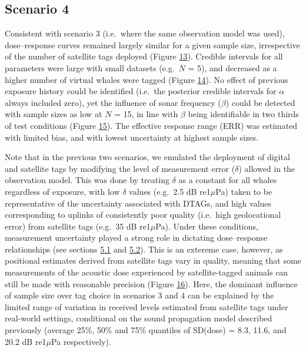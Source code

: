 \documentclass[
]{article}
\begin{document}
\subsection{Scenario 4}

Consistent with scenario 3 (i.e.~where the same observation model was used), dose--response curves remained largely similar for a given sample size, irrespective of the number of satellite tags deployed (Figure \hyperlink{fig13}{13}). Credible intervals for all parameters were large with small datasets (e.g.~\(N\) = 5), and decreased as a higher number of virtual whales were tagged (Figure \hyperlink{fig14}{14}). No effect of previous exposure history could be identified (i.e.~the posterior credible intervals for \(\alpha\) always included zero), yet the influence of sonar frequency (\(\beta\)) could be detected with sample sizes as low at \(N\) = 15, in line with \(\beta\) being identifiable in two thirds of test conditions (Figure \hyperlink{fig15}{15}). The effective response range (ERR) was estimated with limited bias, and with lowest uncertainty at highest sample sizes.

Note that in the previous two scenarios, we emulated the deployment of digital and satellite tags by modifying the level of measurement error (\(\delta\)) allowed in the observation model. This was done by treating \(\delta\) as a constant for all whales regardless of exposure, with low \(\delta\) values (e.g.~2.5 dB re1\(\mu\)Pa) taken to be representative of the uncertainty associated with DTAGs, and high values corresponding to uplinks of consistently poor quality (i.e.~high geolocational error) from satellite tags (e.g.~35 dB re1\(\mu\)Pa). Under these conditions, measurement uncertainty played a strong role in dictating dose--response relationships (see sections \hyperlink{section51}{5.1} and \hyperlink{section52}{5.2}). This is an extereme case, however, as positional estimates derived from satellite tags vary in quality, meaning that some measurements of the acoustic dose experienced by satellite-tagged animals can still be made with reasonable precision (Figure \hyperlink{fig16}{16}). Here, the dominant influence of sample size over tag choice in scenarios 3 and 4 can be explained by the limited range of variation in received levels estimated from satellite tags under real-world settings, conditional on the sound propagation model described previously (average 25\%, 50\% and 75\% quantiles of SD(dose) = 8.3, 11.6, and 20.2 dB re1\(\mu\)Pa respectively).
\end{document}
